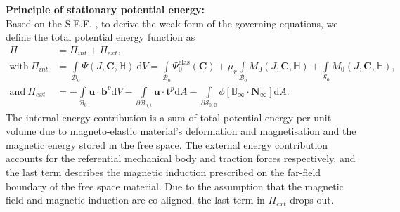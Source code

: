 \noindent \textbf{Principle of stationary potential energy:} \\
Based on the S.E.F. , to derive the weak form of the governing equations, we define the total potential energy function as
\begin{align}
\Pi &= \Pi_{int} + \Pi_{ext}, \\
\text{with} \ \Pi_{int} &= \int\limits_{\mathcal{D}_0} \Psi (J, \mathbf{C}, \mathbb{H}) \ \mathrm{d}V = \int\limits_{\mathcal{B}_0} \Psi_0^{\text{elas}} (\mathbf{C}) + \mu_r \int\limits_{\mathcal{B}_0} M_0 (J, \mathbf{C}, \mathbb{H}) + \int\limits_{\mathcal{S}_0} M_0 (J, \mathbf{C}, \mathbb{H}), \label{eq:3.24.1}\\
\text{and} \ \Pi_{ext} &= -\int\limits_{\mathcal{B}_0} \mathbf{u} \cdot \mathbf{b}^p \mathrm{d} V - \int\limits_{\partial \mathcal{B}_{0,t}} \mathbf{u} \cdot \mathbf{t}^p \mathrm{d}A -\int\limits_{\partial \mathcal{S}_{0,\mathbb{B}}} \phi \left[ \mathbb{B}_{\infty} \cdot \mathbf{N}_{\infty} \right] \mathrm{d}A.  
\label{eq:3.24.2}
\end{align}
The internal energy contribution  is a sum of total potential energy per unit volume due to magneto-elastic material's deformation and magnetisation and the magnetic energy stored in the free space. The external energy contribution  accounts for the referential mechanical body and traction forces respectively, and the last term describes the magnetic induction prescribed on the far-field boundary of the free space material. Due to the assumption that the magnetic field and magnetic induction are co-aligned, the last term in $\Pi_{ext}$ drops out. \par 

